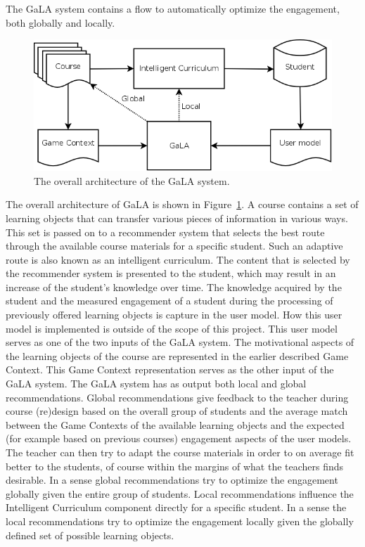 \documentclass[11pt]{article}
\begin{document}
The GaLA system contains a flow to automatically optimize the engagement, both globally and locally.
\begin{figure}
\centering
\includegraphics[width=0.9\linewidth]{gala.png}
\caption{The overall architecture of the GaLA system.\label{fig:gala}}
\end{figure}
The overall architecture of GaLA is shown in Figure~\ref{fig:gala}. A course contains a set of learning objects that can transfer various pieces of information in various ways. This set is passed on to a recommender system that selects the best route through the available course materials for a specific student. Such an adaptive route is also known as an intelligent curriculum. The content that is selected by the recommender system is presented to the student, which may result in an increase of the student’s knowledge over time. The knowledge acquired by the student and the measured engagement of a student during the processing of previously offered learning objects is capture in the user model. How this user model is implemented is outside of the scope of this project. This user model serves as one of the two inputs of the GaLA system. The motivational aspects of the learning objects of the course are represented in the earlier described Game Context. This Game Context representation serves as the other 
input of the GaLA system. The GaLA system has as output both local and global recommendations. Global recommendations give feedback to the teacher during course (re)design based on the overall group of students and the average match between the Game Contexts of the available learning objects and the expected (for example based on previous courses) engagement aspects of the user models. The teacher can then try to adapt the course materials in order to on average fit better to the students, of course within the margins of what the teachers finds desirable. In a sense global recommendations try to optimize the engagement globally given the entire group of students. Local recommendations influence the Intelligent Curriculum component directly for a specific student. In a sense the local recommendations try to optimize the engagement locally given the globally defined set of possible learning objects. 
\end{document}
